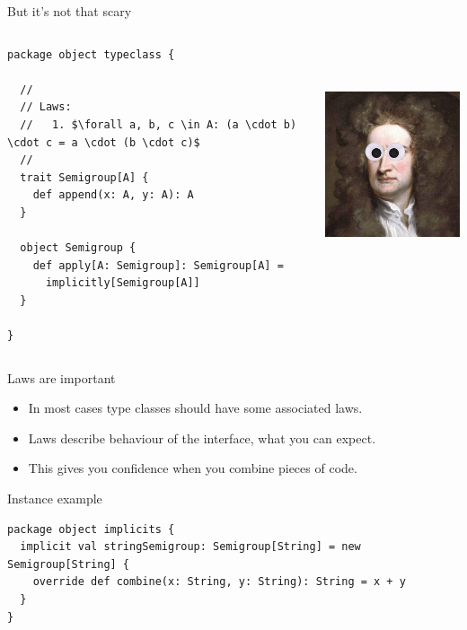 \documentclass[presentation,aspectratio=169,smaller]{beamer}
\begin{document}
\begin{frame}[label={sec:org7002ccb},fragile]{But it’s not that scary}
 \begin{columns}
\begin{column}{0.5\columnwidth}
\begin{verbatim}
package object typeclass {

  //
  // Laws:
  //   1. $\forall a, b, c \in A: (a \cdot b) \cdot c = a \cdot (b \cdot c)$
  //
  trait Semigroup[A] {
    def append(x: A, y: A): A
  }

  object Semigroup {
    def apply[A: Semigroup]: Semigroup[A] =
      implicitly[Semigroup[A]]
  }

}
\end{verbatim}
\end{column}

\begin{column}{0.5\columnwidth}
\begin{center}
\includegraphics[height=7cm]{images/scary.png}
\end{center}
\end{column}
\end{columns}
\end{frame}

\begin{frame}[label={sec:org30f3033}]{Laws are important}
\begin{itemize}
\item In most cases type classes should have some associated laws.
\item Laws describe behaviour of the interface, what you can expect.
\item This gives you confidence when you combine pieces of code.
\end{itemize}
\end{frame}

\begin{frame}[label={sec:orgf8c1a72},fragile]{Instance example}
 \begin{verbatim}
package object implicits {
  implicit val stringSemigroup: Semigroup[String] = new Semigroup[String] {
    override def combine(x: String, y: String): String = x + y
  }
}
\end{verbatim}
\end{frame}
\end{document}
